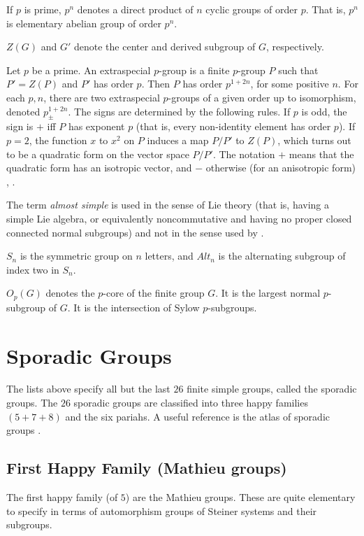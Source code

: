 If $p$ is prime, $p^n$ denotes a direct product of $n$ cyclic groups
of order $p$.  That is, $p^n$ is elementary abelian group of order
$p^n$.  \cite[p.9]{wilson2009finite}

$Z(G)$ and $G'$ denote the center and derived subgroup of $G$,
respectively.

Let $p$ be a prime.  An extraspecial $p$-group is a finite $p$-group
$P$ such that $P' = Z(P)$ and $P'$ has order $p$.  Then $P$ has order
$p^{1+2n}$, for some positive $n$.  For each $p,n$, there are two
extraspecial $p$-groups of a given order up to isomorphism, denoted
$p^{1+2n}_{\pm}$. The signs are determined by the following rules.  If
$p$ is odd, the sign is $+$ iff $P$ has exponent $p$ (that is, every
non-identity element has order $p$).  If $p=2$, the function $x$ to
$x^2$ on $P$ induces a map $P/P'$ to $Z(P)$, which turns out to be a
quadratic form on the vector space $P/P'$.  The notation $+$ means
that the quadratic form has an isotropic vector, and $-$ otherwise
(for an anisotropic form) \cite[p.19]{robert1998twelve},
\cite[pp.59,83]{wilson2009finite}.

The term {\it almost simple} is used in the sense of Lie theory (that
is, having a simple Lie algebra, or equivalently noncommutative and
having no proper closed connected normal subgroups) and not in the
sense used by \cite[p.22]{wilson2009finite}.

$S_n$ is the symmetric group on $n$ letters, and $Alt_n$ is the
alternating subgroup of index two in $S_n$.

$O_p(G)$ denotes the $p$-core of the finite group $G$.  It
is the largest normal $p$-subgroup of $G$.  It is the intersection
of Sylow $p$-subgroups.


\section{Sporadic Groups}

The lists above specify all but the last $26$ finite simple groups,
called the sporadic groups.  The $26$ sporadic groups are classified
into three happy families $(5+7+8)$ and the six pariahs.  A useful
reference is the atlas of sporadic groups \cite{A}.

\subsection{First Happy Family (Mathieu groups)}

The first happy family (of $5$) are the Mathieu groups.  These are quite
elementary to specify in terms of automorphism groups of Steiner
systems and their subgroups.

